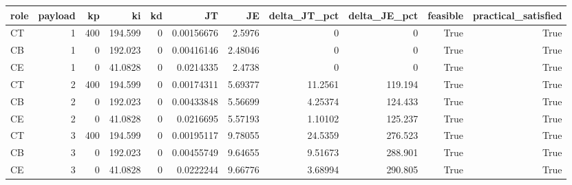 \begin{tabular}{lrrrrrrrrrr}
\toprule
role & payload & kp & ki & kd & JT & JE & delta\_JT\_pct & delta\_JE\_pct & feasible & practical\_satisfied \\
\midrule
CT & 1 & 400 & 194.599 & 0 & 0.00156676 & 2.5976 & 0 & 0 & True & True \\
CB & 1 & 0 & 192.023 & 0 & 0.00416146 & 2.48046 & 0 & 0 & True & True \\
CE & 1 & 0 & 41.0828 & 0 & 0.0214335 & 2.4738 & 0 & 0 & True & True \\
CT & 2 & 400 & 194.599 & 0 & 0.00174311 & 5.69377 & 11.2561 & 119.194 & True & True \\
CB & 2 & 0 & 192.023 & 0 & 0.00433848 & 5.56699 & 4.25374 & 124.433 & True & True \\
CE & 2 & 0 & 41.0828 & 0 & 0.0216695 & 5.57193 & 1.10102 & 125.237 & True & True \\
CT & 3 & 400 & 194.599 & 0 & 0.00195117 & 9.78055 & 24.5359 & 276.523 & True & True \\
CB & 3 & 0 & 192.023 & 0 & 0.00455749 & 9.64655 & 9.51673 & 288.901 & True & True \\
CE & 3 & 0 & 41.0828 & 0 & 0.0222244 & 9.66776 & 3.68994 & 290.805 & True & True \\
\bottomrule
\end{tabular}
